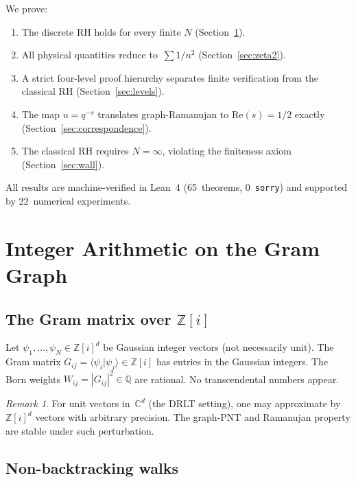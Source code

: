 \documentclass[12pt]{article}
\theoremstyle{definition}
\theoremstyle{remark}
\newtheorem{remark}[theorem]{Remark}
\newcommand{\CC}{\mathbb{C}}
\newcommand{\ZZ}{\mathbb{Z}}
\newcommand{\QQ}{\mathbb{Q}}
\begin{document}
We prove:
\begin{enumerate}[label=(\roman*)]
\item The discrete RH holds for every finite $N$
  (Section~\ref{sec:graph}).
\item All physical quantities reduce to~$\sum 1/n^2$
  (Section~\ref{sec:zeta2}).
\item A strict four-level proof hierarchy separates
  finite verification from the classical RH
  (Section~\ref{sec:levels}).
\item The map $u = q^{-s}$ translates graph-Ramanujan
  to $\mathrm{Re}(s) = 1/2$ exactly
  (Section~\ref{sec:correspondence}).
\item The classical RH requires $N = \infty$,
  violating the finiteness axiom
  (Section~\ref{sec:wall}).
\end{enumerate}

All results are machine-verified in Lean~4 (65~theorems,
0~\texttt{sorry}) and supported by 22~numerical experiments.

\section{Integer Arithmetic on the Gram Graph}
\label{sec:graph}

\subsection{The Gram matrix over $\ZZ[i]$}

Let $\psi_1, \ldots, \psi_N \in \ZZ[i]^d$ be Gaussian integer
vectors (not necessarily unit).
The Gram matrix $G_{ij} = \langle\psi_i|\psi_j\rangle \in \ZZ[i]$
has entries in the Gaussian integers.
The Born weights $W_{ij} = |G_{ij}|^2 \in \QQ$ are rational.
No transcendental numbers appear.

\begin{remark}
For unit vectors in~$\CC^d$ (the DRLT setting), one may
approximate by $\ZZ[i]^d$ vectors with arbitrary precision.
The graph-PNT and Ramanujan property are stable under such
perturbation.
\end{remark}

\subsection{Non-backtracking walks}
\end{document}
